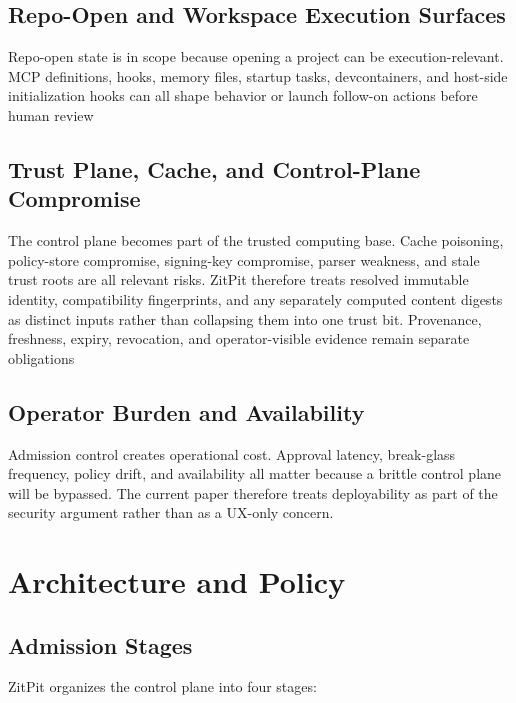 \documentclass[conference]{IEEEtran}
\newcommand{\product}{ZitPit}
\begin{document}
\subsection{Repo-Open and Workspace Execution Surfaces}

Repo-open state is in scope because opening a project can be execution-relevant. MCP definitions, hooks, memory files, startup tasks, devcontainers, and host-side initialization hooks can all shape behavior or launch follow-on actions before human review \cite{anthropicMcp2026,anthropicHooks2026,anthropicMemory2026,anthropicDevcontainer2026,devcontainerSpec2026,vscodeWorkspaceTrust2026}

\subsection{Trust Plane, Cache, and Control-Plane Compromise}

The control plane becomes part of the trusted computing base. Cache poisoning, policy-store compromise, signing-key compromise, parser weakness, and stale trust roots are all relevant risks. \product{} therefore treats resolved immutable identity, compatibility fingerprints, and any separately computed content digests as distinct inputs rather than collapsing them into one trust bit. Provenance, freshness, expiry, revocation, and operator-visible evidence remain separate obligations \cite{tufDocs2026,tufPaper2016,sigstoreDocs2026,slsaDocs2026}

\subsection{Operator Burden and Availability}

Admission control creates operational cost. Approval latency, break-glass frequency, policy drift, and availability all matter because a brittle control plane will be bypassed. The current paper therefore treats deployability as part of the security argument rather than as a UX-only concern.

\section{Architecture and Policy}

\subsection{Admission Stages}

\product{} organizes the control plane into four stages:
\end{document}

